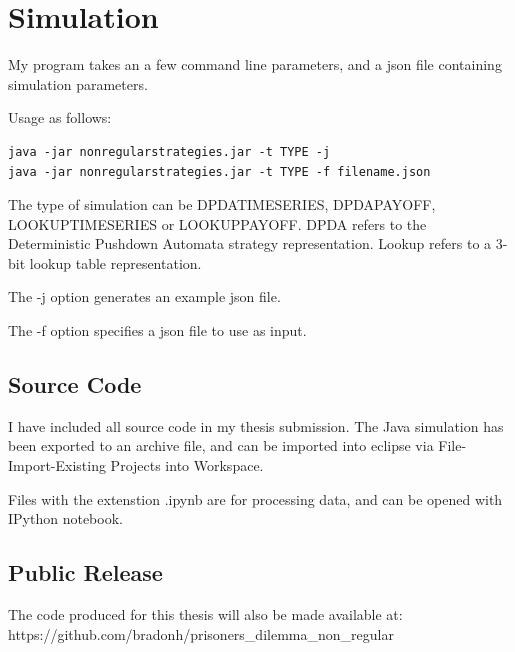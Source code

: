 \documentclass[a4paper,11pt,bcshonoursthesis,singlespace,oneside,thesisdraft,pdflatex]{cssethesis}
\begin{document}
\chapter{Simulation}
My program takes an a few command line parameters, and a json file containing simulation parameters. 

Usage as follows: \\
\begin{verbatim}
java -jar nonregularstrategies.jar -t TYPE -j
java -jar nonregularstrategies.jar -t TYPE -f filename.json
\end{verbatim}
The type of simulation can be DPDATIMESERIES, DPDAPAYOFF, LOOKUPTIMESERIES or LOOKUPPAYOFF. 
DPDA refers to the Deterministic Pushdown Automata strategy representation. 
Lookup refers to a 3-bit lookup table representation. 

The -j option generates an example json file. 

The -f option specifies a json file to use as input. 
\section{Source Code}
\label{app:code}
I have included all source code in my thesis submission. 
The Java simulation has been exported to an archive file, and can be imported into eclipse via File-Import-Existing Projects into Workspace.

Files with the extenstion .ipynb are for processing data, and can be opened with IPython notebook. 
\section{Public Release}
The code produced for this thesis will also be made available at: \\
https://github.com/bradonh/prisoners\_dilemma\_non\_regular





\end{document}
